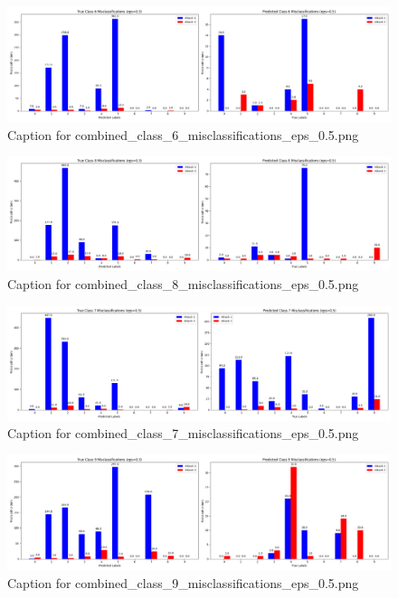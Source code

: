 \documentclass[11pt,onside]{article}
\begin{document}
\begin{figure}[ht]
\centering
\includegraphics[width=1\textwidth]{combined_class_boundary_pgd/combined_class_6_misclassifications_eps_0.5.png}
\caption{Caption for combined_class_6_misclassifications_eps_0.5.png}
\label{fig:combined_class_6_misclassifications_eps_0.5.png}
\end{figure}



\begin{figure}[ht]
\centering
\includegraphics[width=1\textwidth]{combined_class_boundary_pgd/combined_class_8_misclassifications_eps_0.5.png}
\caption{Caption for combined_class_8_misclassifications_eps_0.5.png}
\label{fig:combined_class_8_misclassifications_eps_0.5.png}
\end{figure}

\begin{figure}[ht]
\centering
\includegraphics[width=1\textwidth]{combined_class_boundary_pgd/combined_class_7_misclassifications_eps_0.5.png}
\caption{Caption for combined_class_7_misclassifications_eps_0.5.png}
\label{fig:combined_class_7_misclassifications_eps_0.5.png}
\end{figure}

\begin{figure}[ht]
\centering
\includegraphics[width=1\textwidth]{combined_class_boundary_pgd/combined_class_9_misclassifications_eps_0.5.png}
\caption{Caption for combined_class_9_misclassifications_eps_0.5.png}
\label{fig:combined_class_9_misclassifications_eps_0.5.png}
\end{figure}
\end{document}
